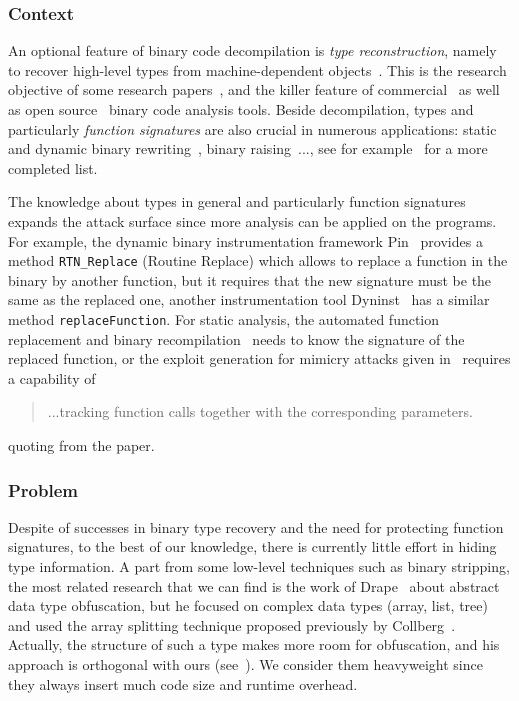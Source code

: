 \documentclass[compsoc,conference,a4paper,10pt,times]{IEEEtran}
\begin{document}
\subsubsection*{Context}
An optional feature of binary code decompilation is \emph{type reconstruction}, namely to recover high-level types from machine-dependent
objects~\cite{mycroft_type-based_1999, van_emmerik_static_2007}. This is the research objective of some
research papers~\cite{lee_tie_2011,elwazeer_scalable_2013,robbins_minx_2016,noonan_polymorphic_2016},
and the killer feature of commercial~\cite{noauthor_hex-rays_nodate,noauthor_jeb_nodate}
as well as open source~\cite{noauthor_ghidra_nodate} binary code analysis tools. Beside decompilation,
types and particularly \emph{function signatures} are also crucial in numerous applications: 
static and dynamic binary rewriting~\cite{bernat_anywhere_2011,anand_compiler-level_2013}, 
binary raising~\cite{yadavalli_raising_2019,goodman_lifting_2018}..., see for
example~\cite{caballero_type_2016} for a more completed list.

The knowledge about types in general
and particularly function signatures expands the attack surface since more analysis can be applied on 
the programs. For example, the dynamic binary instrumentation framework Pin~\cite{luk_pin_2005} provides a 
method \texttt{RTN\_Replace} (Routine Replace) which allows to replace a function in the binary by 
another function, but it requires that the new signature must be the same as the replaced 
one, another instrumentation tool Dyninst~\cite{bernat_anywhere_2011} has a similar method 
\texttt{replaceFunction}. For static analysis, the automated function replacement and binary 
recompilation~\cite{gupta_rewriting_2019} needs to know the signature of the replaced function, or
the exploit generation for mimicry attacks given in~\cite{kruegel_automating_2005} requires a capability of
\begin{quote}
...tracking function calls together with the corresponding parameters.
\end{quote}
quoting from the paper.

\subsubsection*{Problem}
Despite of successes in binary type recovery and the need for protecting function signatures, to the best
of our knowledge, there is currently little effort in hiding type information. A part from some low-level
techniques such as binary stripping, the most related research that we
can find is the work of Drape~\cite{drape_generalising_2007,drape_obfuscation_2004,drape_obfuscation_2006}
about abstract data type obfuscation, but he focused on complex data types (array, list, tree) and used
the array splitting technique proposed previously by Collberg~\cite{collberg_taxonomy_1997}.
Actually, the structure of such a
type makes more room for obfuscation, and his approach is orthogonal with ours (see~).
We consider them heavyweight since they always insert much code size and runtime overhead.
\end{document}
